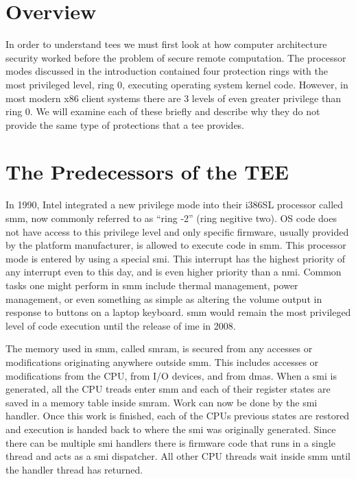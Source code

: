 \section{Overview}
In order to understand \glspl{tee} we must first look at how computer architecture security worked before the problem of secure remote computation. The processor modes discussed in the introduction contained four protection rings with the most privileged level, ring 0, executing operating system kernel code. However, in most modern x86 client systems there are 3 levels of even greater privilege than ring 0. We will examine each of these briefly and describe why they do not provide the same type of protections that a \gls{tee} provides.

\section{The Predecessors of the TEE}

In 1990, Intel integrated a new privilege mode into their i386SL processor called \gls{smm}, \cite{zimmer2005hardened} now commonly referred to as ``ring -2'' (ring negitive two).  OS code does not have access to this privilege level and only specific firmware, usually provided by the platform manufacturer, is allowed to execute code in \gls{smm}. This processor mode is entered by using a special \gls{smi}. This interrupt has the highest priority of any interrupt even to this day, and is even higher priority than a \gls{nmi}. Common tasks one might perform in \gls{smm} include thermal management, power management, or even something as simple as altering the volume output in response to buttons on a laptop keyboard. \cite{yao2009system} \gls{smm} would remain the most privileged level of code execution until the release of \gls{ime} in 2008. \cite{eldar2008configuring}

The memory used in \gls{smm}, called \gls{smram}, is secured from any accesses or modifications originating anywhere outside \gls{smm}. This includes accesses or modifications from the CPU, from I/O devices, and from \glspl{dma}. When a \gls{smi} is generated, all the CPU treads enter \gls{smm} and each of their register states are saved in a memory table inside \gls{smram}. Work can now be done by the \gls{smi} handler. Once this work is finished, each of the CPUs previous states are restored and execution is handed back to where the \gls{smi} was originally generated. Since there can be multiple \gls{smi} handlers there is firmware code that runs in a single thread and acts as a \gls{smi} dispatcher. All other CPU threads wait inside \gls{smm} until the handler thread has returned. \cite{delgado2013}

